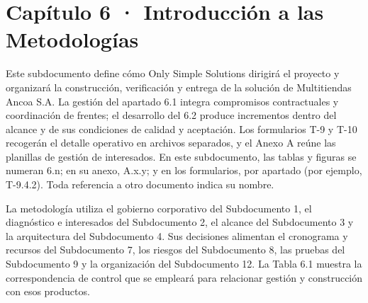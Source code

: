 \documentclass[11pt]{article}
\begin{document}

\renewcommand{\contentsname}{Índice general}
\renewcommand{\listfigurename}{Lista de figuras}
\renewcommand{\listtablename}{Lista de tablas}
\renewcommand{\tablename}{Tabla}
\renewcommand{\figurename}{Figura}
\renewcommand{\thefigure}{6.\arabic{figure}}
\renewcommand{\thetable}{6.\arabic{table}}
\setcounter{tocdepth}{4}
\makeatletter
\renewcommand\paragraph{\@startsection{paragraph}{4}{\z@}{2.2ex \@plus 1ex \@minus .2ex}{0.6ex}{\normalfont\normalsize\bfseries}}
\renewcommand\subparagraph{\@startsection{subparagraph}{5}{\z@}{1.8ex \@plus .6ex \@minus .2ex}{0.4ex}{\normalfont\normalsize\bfseries\itshape}}
\renewcommand*\l@figure{\@dottedtocline{1}{1.5em}{2.9em}}
\renewcommand*\l@table{\@dottedtocline{1}{1.5em}{2.9em}}

\makeatother
\tableofcontents
\clearpage
\listoffigures
\clearpage
\listoftables
\clearpage

\section{Capítulo 6 · Introducción a las Metodologías}\label{capitulo-6-introduccion-a-las-metodologias}

Este subdocumento define cómo Only Simple Solutions dirigirá el proyecto
y organizará la construcción, verificación y entrega de la solución de
Multitiendas Ancoa S.A. La gestión del apartado 6.1 integra compromisos
contractuales y coordinación de frentes; el desarrollo del 6.2 produce
incrementos dentro del alcance y de sus condiciones de calidad y
aceptación. Los formularios T-9 y T-10 recogerán el detalle operativo en archivos separados, y el Anexo A reúne las planillas de gestión de interesados. En este subdocumento, las tablas y figuras se numeran 6.n; en su anexo, A.x.y; y en los formularios, por apartado (por ejemplo, T-9.4.2). Toda referencia a otro documento indica su nombre.

La metodología utiliza el gobierno corporativo del Subdocumento 1, el
diagnóstico e interesados del Subdocumento 2, el alcance del Subdocumento 3 y la arquitectura del
Subdocumento 4. Sus decisiones alimentan el cronograma y recursos del Subdocumento 7, los riesgos
del Subdocumento 8, las pruebas del Subdocumento 9 y la organización del Subdocumento 12. La Tabla 6.1 muestra
la correspondencia de control que se empleará para relacionar gestión y
construcción con esos productos.
\end{document}
